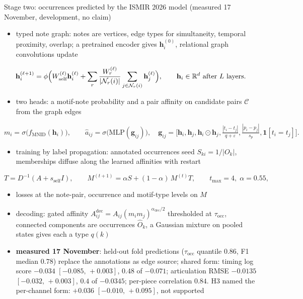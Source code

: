 \documentclass[aspectratio=169,11pt]{beamer}
\newcommand{\R}{\mathbb{R}}
\begin{document}
\begin{frame}{Stage two: occurrences predicted by the ISMIR 2026 model (measured 17 November, development, no claim)}
  \scriptsize
  \begin{itemize}
    \item typed note graph: notes are vertices, edge types for simultaneity, temporal proximity, overlap; a pretrained encoder gives $\mathbf h_i^{(0)}$, relational graph convolutions update
  \end{itemize}
  \[
    \mathbf h_i^{(\ell+1)} = \phi\Bigl( W^{(\ell)}_{\text{self}} \mathbf h_i^{(\ell)}
      + \sum_{r} \frac{W^{(\ell)}_r}{|\mathcal N_r(i)|} \sum_{j \in \mathcal N_r(i)} \mathbf h_j^{(\ell)} \Bigr),
    \qquad \mathbf h_i \in \R^{d} \text{ after } L \text{ layers.}
  \]
  \vspace{-1mm}
  \begin{itemize}
    \item two heads: a motif-note probability and a pair affinity on candidate pairs $\mathcal C$ from the graph edges
  \end{itemize}
  \[
    m_i = \sigma\bigl(f_{\text{MNID}}(\mathbf h_i)\bigr), \qquad
    \hat a_{ij} = \sigma\bigl(\mathrm{MLP}(\mathbf g_{ij})\bigr), \quad
    \mathbf g_{ij} = \bigl[\mathbf h_i, \mathbf h_j, \mathbf h_i \odot \mathbf h_j,
      \tfrac{|t_i - t_j|}{q + \varepsilon}, \tfrac{|p_i - p_j|}{s_p}, \mathbf 1[t_i = t_j]\bigr].
  \]
  \vspace{-1mm}
  \begin{itemize}
    \item training by label propagation: annotated occurrences seed $S_{ki} = 1/|O_k|$, memberships diffuse along the learned affinities with restart
  \end{itemize}
  \[
    T = D^{-1}(A + s_{\text{self}} I), \qquad
    M^{(t+1)} = \alpha S + (1 - \alpha)\, M^{(t)} T, \qquad
    t_{\max} = 4,\; \alpha = 0.55,
  \]
  \vspace{-1mm}
  \begin{itemize}
    \item losses at the note-pair, occurrence and motif-type levels on $M$
    \item decoding: gated affinity $A^{\text{dec}}_{ij} = A_{ij}(m_i m_j)^{\alpha_{\text{dec}}/2}$ thresholded at $\tau_{\text{occ}}$, connected components are occurrences $\hat O_k$, a Gaussian mixture on pooled states gives each a type $q(k)$
    \item \textbf{measured 17 November}: held-out fold predictions ($\tau_{\text{occ}}$ quantile $0.86$, F1 median $0.78$) replace the annotations as edge source; shared form: timing log score $-0.034$ $[-0.085,\,+0.003]$, $0.48$ of $-0.071$; articulation RMSE $-0.0135$ $[-0.032,\,+0.003]$, $0.4$ of $-0.0345$; per-piece correlation $0.84$. H3 named the per-channel form: $+0.036$ $[-0.010,\,+0.095]$, not supported
  \end{itemize}
\end{frame}
\end{document}
